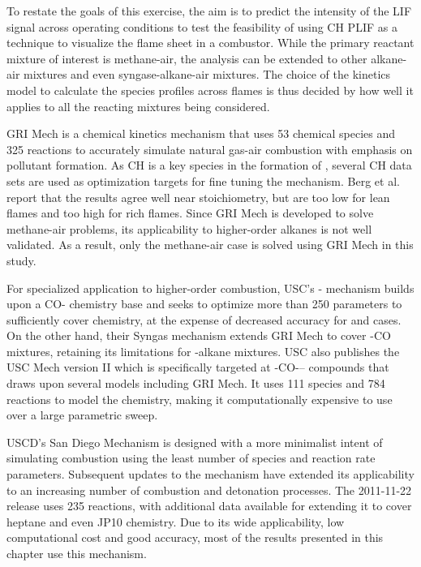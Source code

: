 To restate the goals of this exercise, the aim is to predict the intensity of the LIF signal across operating conditions to test the feasibility of using CH PLIF as a technique to visualize the flame sheet in a combustor.
While the primary reactant mixture of interest is methane-air, the analysis can be extended to other alkane-air mixtures and even syngase-alkane-air mixtures.
The choice of the kinetics model to calculate the species profiles across flames is thus decided by how well it applies to all the reacting mixtures being considered.

GRI Mech is a chemical kinetics mechanism that uses 53 chemical species and 325 reactions to accurately simulate natural gas-air combustion with emphasis on pollutant formation.
As CH is a key species in the formation of , several CH data sets are used as optimization targets for fine tuning the mechanism.
Berg et al.\cite{2000-berg} report that the results agree well near stoichiometry, but are too low for lean flames and too high for rich flames.
Since GRI Mech is developed to solve methane-air problems, its applicability to higher-order alkanes is not well validated.
As a result, only the methane-air case is solved using GRI Mech in this study.

For specialized application to higher-order combustion, USC's - mechanism builds upon a CO- chemistry base and seeks to optimize more than 250 parameters to sufficiently cover  chemistry, at the expense of decreased accuracy for  and  cases.
On the other hand, their Syngas mechanism extends GRI Mech to cover -CO mixtures, retaining its limitations for -alkane mixtures.
USC also publishes the USC Mech version II which is specifically targeted at -CO--- compounds that draws upon several models including GRI Mech.
It uses 111 species and 784 reactions to model the chemistry, making it computationally expensive to use over a large parametric sweep.

USCD's San Diego Mechanism is designed with a more minimalist intent of simulating combustion using the least number of species and reaction rate parameters.
Subsequent updates to the mechanism have extended its applicability to an increasing number of combustion and detonation processes.
The 2011-11-22 release uses 235 reactions, with additional data available for extending it to cover heptane and even JP10 chemistry.
Due to its wide applicability, low computational cost and good accuracy, most of the results presented in this chapter use this mechanism.


